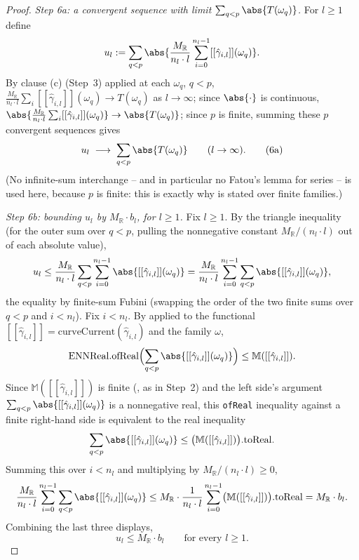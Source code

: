 \begin{proof}
  \emph{Step 6a: a convergent sequence with limit $\sum_{q<p}\abs{T(\omega_q)}$.} For $l\ge1$
  define
  \[
    u_l := \sum_{q<p}\abs{\frac{M_{\mathbb R}}{n_l\cdot l}\sum_{i=0}^{n_l-1}
      [[\hat\gamma_{i,l}]](\omega_q)}
    .
  \]
  By clause (c) (Step~3) applied at each $\omega_q$, $q<p$,
  $\frac{M_{\mathbb R}}{n_l\cdot l}\sum_i[[\hat\gamma_{i,l}]](\omega_q) \to T(\omega_q)$ as
  $l\to\infty$; since $\abs{\cdot}$ is continuous, $\abs{\frac{M_{\mathbb R}}{n_l\cdot l}\sum_i
  [[\hat\gamma_{i,l}]](\omega_q)} \to \abs{T(\omega_q)}$; since $p$ is finite, summing these $p$
  convergent sequences gives
  \begin{equation}\label{eq:bba-uconv}
    u_l \;\longrightarrow\; \sum_{q<p}\abs{T(\omega_q)}
    \qquad(l\to\infty)
    . \tag{6a}
  \end{equation}
  (No infinite-sum interchange -- and in particular no Fatou's lemma for series -- is used here,
  because $p$ is finite: this is exactly why  is stated over finite
  families.)

  \emph{Step 6b: bounding $u_l$ by $M_{\mathbb R}\cdot b_l$, for $l\ge1$.} Fix $l\ge1$. By the
  triangle inequality (for the outer sum over $q<p$, pulling the nonnegative constant
  $M_{\mathbb R}/(n_l\cdot l)$ out of each absolute value),
  \[
    u_l \le \frac{M_{\mathbb R}}{n_l\cdot l}\sum_{q<p}\sum_{i=0}^{n_l-1}
      \abs{[[\hat\gamma_{i,l}]](\omega_q)}
    = \frac{M_{\mathbb R}}{n_l\cdot l}\sum_{i=0}^{n_l-1}\sum_{q<p}
      \abs{[[\hat\gamma_{i,l}]](\omega_q)}
    ,
  \]
  the equality by finite-sum Fubini (swapping the order of the two finite sums over $q<p$ and
  $i<n_l$). Fix $i<n_l$. By  applied to the functional
  $[[\hat\gamma_{i,l}]] = \mathrm{curveCurrent}(\hat\gamma_{i,l})$ and the family $\omega$,
  \[
    \mathrm{ENNReal.ofReal}\Bigl(\sum_{q<p}\abs{[[\hat\gamma_{i,l}]](\omega_q)}\Bigr)
    \le \mathbb M([[\hat\gamma_{i,l}]])
    .
  \]
  Since $\mathbb M([[\hat\gamma_{i,l}]])$ is finite (, as in Step~2)
  and the left side's argument $\sum_{q<p}\abs{[[\hat\gamma_{i,l}]](\omega_q)}$ is a nonnegative
  real, this \texttt{ofReal} inequality against a finite right-hand side is equivalent to the real
  inequality
  \[
    \sum_{q<p}\abs{[[\hat\gamma_{i,l}]](\omega_q)} \le \bigl(\mathbb M([[\hat\gamma_{i,l}]])\bigr).\mathrm{toReal}
    .
  \]
  Summing this over $i<n_l$ and multiplying by $M_{\mathbb R}/(n_l\cdot l)\ge0$,
  \[
    \frac{M_{\mathbb R}}{n_l\cdot l}\sum_{i=0}^{n_l-1}\sum_{q<p}\abs{[[\hat\gamma_{i,l}]](\omega_q)}
    \le
    M_{\mathbb R}\cdot\frac1{n_l\cdot l}\sum_{i=0}^{n_l-1}
      \bigl(\mathbb M([[\hat\gamma_{i,l}]])\bigr).\mathrm{toReal}
    = M_{\mathbb R}\cdot b_l
    .
  \]
  Combining the last three displays,
  \begin{equation}\label{eq:bba-uble}
    u_l \le M_{\mathbb R}\cdot b_l \qquad\text{for every } l\ge1
    . \tag{6b}
  \end{equation}


\end{proof}
